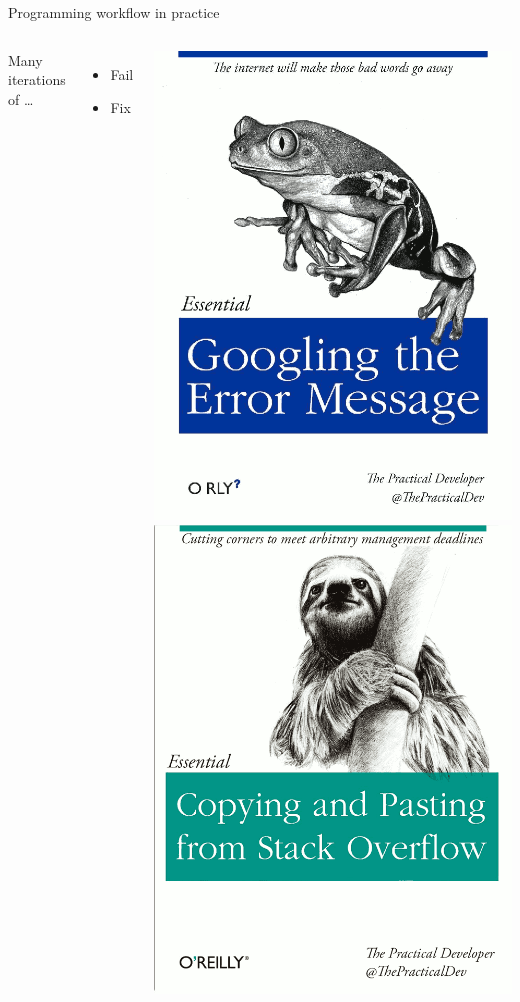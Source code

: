 \documentclass[aspectratio=169,usenames,dvipsnames]{beamer}
\begin{document}
\begin{frame}{Programming workflow in practice}
	\begin{columns}
			Many iterations of \dots
			\begin{itemize}
				\item Fail
				\item Fix
			\end{itemize}

			\includegraphics[width=0.45\linewidth]{fig/googling}
			\includegraphics[width=0.45\linewidth]{fig/stackoverflow}
	\end{columns}
\end{frame}
\end{document}
